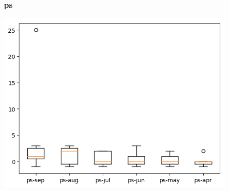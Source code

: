 \documentclass[a4paper]{article}
\begin{document}
\subsubsection{ps}
\includegraphics[width=0.9\textwidth]{../Code/boxPlotsGemma/boxplots/ps.png}




\end{document}
